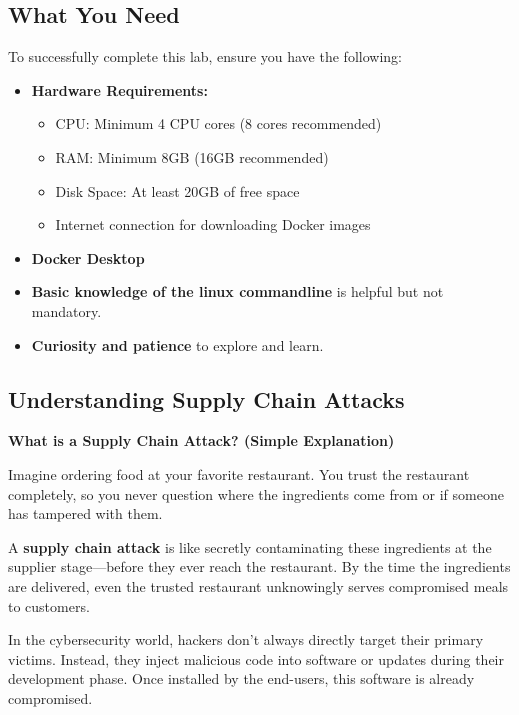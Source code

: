 \documentclass[12pt]{scrartcl}
\newenvironment{hintbox}{%
    \def\FrameCommand{\fboxsep=\FrameSep\colorbox{hintgreen!20}}%
    \MakeFramed {\advance\hsize-\width \FrameRestore}}%
    {\endMakeFramed}
\begin{document}
    \vspace{1em}

    \subsection{What You Need}

    To successfully complete this lab, ensure you have the following:
    \begin{itemize}[itemsep=0.5em]
        \item \textbf{Hardware Requirements:}
        \begin{itemize}
            \item CPU: Minimum 4 CPU cores (8 cores recommended)
            \item RAM: Minimum 8GB (16GB recommended)
            \item Disk Space: At least 20GB of free space
            \item Internet connection for downloading Docker images
        \end{itemize}
        \item \textbf{Docker Desktop}
        \item \textbf{Basic knowledge of the linux commandline} is helpful but not mandatory.
        \item \textbf{Curiosity and patience} to explore and learn.
    \end{itemize}

    \vspace{1em}

    \subsection{Understanding Supply Chain Attacks}

    \begin{hintbox}
    \textbf{What is a Supply Chain Attack? (Simple Explanation)}

    Imagine ordering food at your favorite restaurant. You trust the restaurant completely, so you never question where the ingredients come from or if someone has tampered with them. 

    A \textbf{supply chain attack} is like secretly contaminating these ingredients at the supplier stage—before they ever reach the restaurant. By the time the ingredients are delivered, even the trusted restaurant unknowingly serves compromised meals to customers.

    In the cybersecurity world, hackers don't always directly target their primary victims. Instead, they inject malicious code into software or updates during their development phase. Once installed by the end-users, this software is already compromised.

    \end{hintbox}
\end{document}
